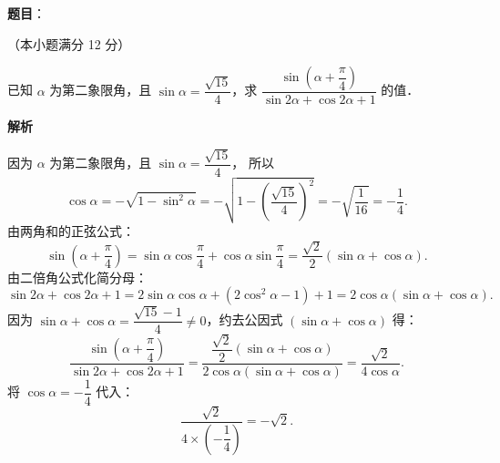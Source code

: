 \begin{answer}

\textbf{题目}：

（本小题满分 12 分）

已知 $\alpha$ 为第二象限角，且 $\sin\alpha=\dfrac{\sqrt{15}}{4}$，求 $\dfrac{\sin\left(\alpha+\dfrac{\pi}{4}\right)}{\sin 2\alpha+\cos 2\alpha+1}$ 的值．

\textbf{解析}

因为 $\alpha$ 为第二象限角，且 $\sin\alpha=\dfrac{\sqrt{15}}{4}$，
所以
\nopagebreak[4]
\[
\cos\alpha=-\sqrt{1-\sin^2\alpha}=-\sqrt{1-\left(\frac{\sqrt{15}}{4}\right)^2}=-\sqrt{\frac{1}{16}}=-\frac{1}{4}.
\]
由两角和的正弦公式：
\nopagebreak[4]
\[
\sin\left(\alpha+\frac{\pi}{4}\right)=\sin\alpha\cos\frac{\pi}{4}+\cos\alpha\sin\frac{\pi}{4}=\frac{\sqrt{2}}{2}(\sin\alpha+\cos\alpha).
\]
由二倍角公式化简分母：
\nopagebreak[4]
\[
\sin 2\alpha+\cos 2\alpha+1=2\sin\alpha\cos\alpha+(2\cos^2\alpha-1)+1=2\cos\alpha(\sin\alpha+\cos\alpha).
\]
因为 $\sin\alpha+\cos\alpha=\dfrac{\sqrt{15}-1}{4}\neq 0$，约去公因式 $(\sin\alpha+\cos\alpha)$ 得：
\nopagebreak[4]
\[
\frac{\sin\left(\alpha+\dfrac{\pi}{4}\right)}{\sin 2\alpha+\cos 2\alpha+1}=\frac{\dfrac{\sqrt{2}}{2}(\sin\alpha+\cos\alpha)}{2\cos\alpha(\sin\alpha+\cos\alpha)}=\frac{\sqrt{2}}{4\cos\alpha}.
\]
将 $\cos\alpha=-\dfrac{1}{4}$ 代入：
\nopagebreak[4]
\[
\frac{\sqrt{2}}{4\times\left(-\dfrac{1}{4}\right)}=-\sqrt{2}.
\]


\end{answer}
